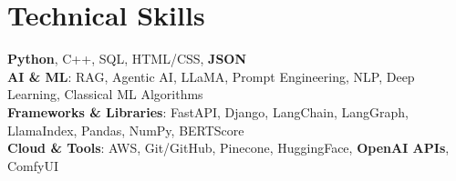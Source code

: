\documentclass[letterpaper,10pt]{article}
\begin{document}
\section{Technical Skills}
 \begin{itemize}[leftmargin=0.15in, label={}]
    \small{\item{
     \textbf{Python}, C++, SQL, HTML/CSS, \textbf{JSON} \\
     \textbf{AI \& ML}{: RAG, Agentic AI, LLaMA, Prompt Engineering, NLP, Deep Learning, Classical ML Algorithms} \\
     \textbf{Frameworks \& Libraries}{: FastAPI, Django, LangChain, LangGraph, LlamaIndex, Pandas, NumPy, BERTScore} \\
     \textbf{Cloud \& Tools}{: AWS, Git/GitHub, Pinecone, HuggingFace, \textbf{OpenAI APIs}, ComfyUI}
    }}
 \end{itemize}
\end{document}
